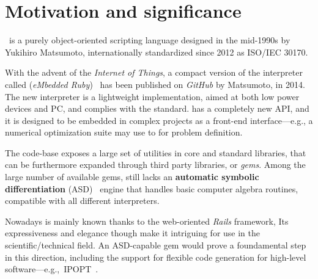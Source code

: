 
\section{Motivation and significance}
\label{sec:motivation}

\Ruby \cite{flanagan2008ruby}~is a purely object-oriented scripting language designed in the mid-1990s by Yukihiro Matsumoto, internationally standardized since 2012 as ISO/IEC 30170.

With the advent of the \emph{Internet of Things}, a compact version of the \Ruby interpreter called \Mruby (\emph{eMbedded Ruby})~\cite{tanaka2015mruby} has been published on \emph{GitHub} by Matsumoto, in 2014. The new interpreter is a lightweight implementation, aimed at both low power devices and PC, and complies with the standard\cite{iso30170}. \Mruby has a completely new API, and it is designed to be embedded in complex projects as a front-end interface---e.g., a numerical optimization suite may use \Mruby to for problem definition.

The \Ruby code-base exposes a large set of utilities in core and standard libraries, that can be furthermore expanded through third party libraries, or \emph{gems}. Among the large number of available gems, \Ruby still lacks an \textbf{automatic symbolic differentiation} (ASD)~\cite{tolsma1998computational} engine that handles basic computer algebra routines, compatible with all different \Ruby interpreters.

Nowadays \Ruby is mainly known thanks to the web-oriented \emph{Rails} framework, Its expressiveness and elegance though make it intriguing for use in the scientific/technical field. An ASD-capable gem would prove a foundamental step in this direction, including the support for flexible code generation for high-level software---e.g.,\ IPOPT~\cite{wachter2009ipopt, wachter2006}\@.

